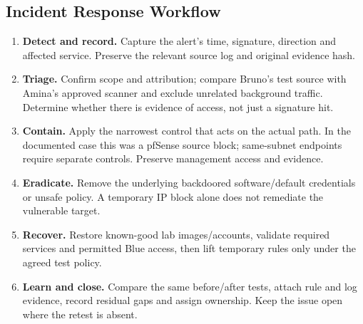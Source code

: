 \documentclass[11pt,a4paper]{article}
\begin{document}
\subsection{Incident Response Workflow}
\begin{enumerate}
\item \textbf{Detect and record.} Capture the alert's time, signature, direction and affected service. Preserve the relevant source log and original evidence hash.
\item \textbf{Triage.} Confirm scope and attribution; compare Bruno's test source with Amina's approved scanner and exclude unrelated background traffic. Determine whether there is evidence of access, not just a signature hit.
\item \textbf{Contain.} Apply the narrowest control that acts on the actual path. In the documented case this was a pfSense source block; same-subnet endpoints require separate controls. Preserve management access and evidence.
\item \textbf{Eradicate.} Remove the underlying backdoored software/default credentials or unsafe policy. A temporary IP block alone does not remediate the vulnerable target.
\item \textbf{Recover.} Restore known-good lab images/accounts, validate required services and permitted Blue access, then lift temporary rules only under the agreed test policy.
\item \textbf{Learn and close.} Compare the same before/after tests, attach rule and log evidence, record residual gaps and assign ownership. Keep the issue open where the retest is absent.
\end{enumerate}
\end{document}
